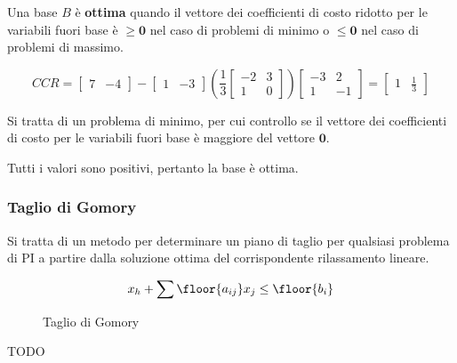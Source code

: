\documentclass[\main/main.tex]{subfiles}
\begin{document}
\begin{definition}
  Una base $B$ è \textbf{ottima} quando il vettore dei coefficienti di costo ridotto per le variabili fuori base è $\geq \bm{0}$ nel caso di problemi di minimo o $\leq \bm{0}$ nel caso di problemi di massimo.
\end{definition}

\[
  CCR = \begin{bmatrix}
    7 & -4
  \end{bmatrix}
  -
  \begin{bmatrix}
    1 & -3
  \end{bmatrix}
  \left(
  \frac{1}{3}
  \begin{bmatrix}
    -2 & 3 \\
    1  & 0
  \end{bmatrix}
  \right)
  \begin{bmatrix}
    -3 & 2  \\
    1  & -1
  \end{bmatrix}
  = \begin{bmatrix}
    1 & \frac{1}{3}
  \end{bmatrix}
\]

Si tratta di un problema di minimo, per cui controllo se il vettore dei coefficienti di costo per le variabili fuori base è maggiore del vettore $\bm{0}$.

Tutti i valori sono positivi, pertanto la base è ottima.

\subsubsection*{Taglio di Gomory}

\begin{definition}
  Si tratta di un metodo per determinare un piano di taglio per qualsiasi problema di PI a partire dalla soluzione ottima del corrispondente rilassamento lineare.

  \begin{figure}
    \[
      x_h + \sum \floor{a_{ij}}x_j \leq \floor{b_i}
    \]
    \caption{Taglio di Gomory}
  \end{figure}
\end{definition}

TODO
\end{document}
